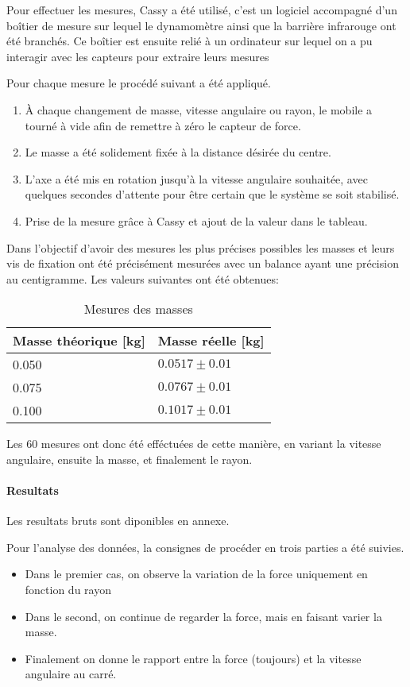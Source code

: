 Pour effectuer les mesures, Cassy a été utilisé, c'est un logiciel accompagné d'un boîtier de mesure sur lequel le dynamomètre ainsi que la barrière infrarouge ont été branchés.
Ce boîtier est ensuite relié à un ordinateur sur lequel on a pu interagir avec les capteurs pour extraire leurs mesures

Pour chaque mesure le procédé suivant a été appliqué.
\begin{enumerate}
    \item À chaque changement de masse, vitesse angulaire ou rayon, le mobile a tourné à vide afin de remettre à zéro le capteur de force.
    \item Le masse a été solidement fixée à la distance désirée du centre.
    \item L'axe a été mis en rotation jusqu'à la vitesse angulaire souhaitée, avec quelques secondes d'attente pour être certain que le système se soit stabilisé.
    \item Prise de la mesure grâce à Cassy et ajout de la valeur dans le tableau.
\end{enumerate}

Dans l'objectif d'avoir des mesures les plus précises possibles les masses et leurs vis de fixation ont été précisément mesurées avec un balance ayant une précision au centigramme. Les valeurs suivantes ont été obtenues:
\begin{table}[ht]
    \caption[Mesure des masses]{Mesures des masses}
    \centering
    \begin{tabular}{|l|l|}
	\hline
	Masse théorique [kg] & Masse réelle [kg]\\
	\hline
	0.050 & $0.0517 \pm 0.01$\\
	0.075 & $0.0767 \pm 0.01$\\
	0.100 & $0.1017 \pm 0.01$\\
	\hline
    \end{tabular}
\end{table}

Les 60 mesures ont donc été efféctuées de cette manière, en variant la vitesse angulaire, ensuite la masse, et finalement le rayon. 

\paragraph{Resultats}
Les resultats bruts sont diponibles en annexe.

Pour l'analyse des données, la consignes de procéder en trois parties a été suivies.
\begin{itemize}
    \item Dans le premier cas, on observe la variation de la force uniquement en fonction du rayon
    \item Dans le second, on continue de regarder la force, mais en faisant varier la masse.
    \item Finalement on donne le rapport entre la force (toujours) et la vitesse angulaire au carré.
\end{itemize}

